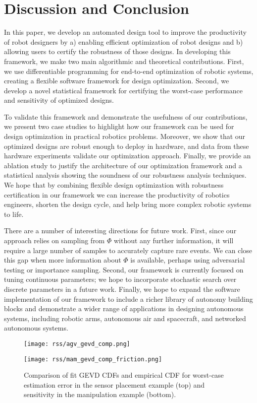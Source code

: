 \section{Discussion and Conclusion}

In this paper, we develop an automated design tool to improve the productivity of robot designers by a) enabling efficient optimization of robot designs and b) allowing users to certify the robustness of those designs. In developing this framework, we make two main algorithmic and theoretical contributions. First, we use differentiable programming for end-to-end optimization of robotic systems, creating a flexible software framework for design optimization. Second, we develop a novel statistical framework for certifying the worst-case performance and sensitivity of optimized designs.

To validate this framework and demonstrate the usefulness of our contributions, we present two case studies to highlight how our framework can be used for design optimization in practical robotics problems. Moreover, we show that our optimized designs are robust enough to deploy in hardware, and data from these hardware experiments validate our optimization approach. Finally, we provide an ablation study to justify the architecture of our optimization framework and a statistical analysis showing the soundness of our robustness analysis techniques. We hope that by combining flexible design optimization with robustness certification in our framework we can increase the productivity of robotics engineers, shorten the design cycle, and help bring more complex robotic systems to life.

There are a number of interesting directions for future work. First, since our approach relies on sampling from $\Phi$ without any further information, it will require a large number of samples to accurately capture rare events. We can close this gap when more information about $\Phi$ is available, perhaps using adversarial testing or importance sampling. Second, our framework is currently focused on tuning continuous parameters; we hope to incorporate stochastic search over discrete parameters in a future work. Finally, we hope to expand the software implementation of our framework to include a richer library of autonomy building blocks and demonstrate a wider range of applications in designing autonomous systems, including robotic arms, autonomous air and spacecraft, and networked autonomous systems.

\begin{figure}[tb]
    \centering
    \texttt{[image: rss/agv\_gevd\_comp.png]}

    \texttt{[image: rss/mam\_gevd\_comp\_friction.png]}
    \caption{Comparison of fit GEVD CDFs and empirical CDF for worst-case estimation error in the sensor placement example (top) and sensitivity in the manipulation example (bottom).}
    \label{ch:rss:fig:ks_test}
\end{figure}

